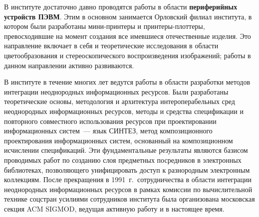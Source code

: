 \begin{multicols}{2}
{}

     В институте достаточно давно проводятся работы в области
\textbf{периферийных устройств ПЭВМ}. Этим в основном
занимается Орловский филиал института, в котором были
разработаны ми\-ни-прин\-те\-ры и прин\-те\-ры-плот\-те\-ры, превосходившие
на момент создания все имевшиеся отечественные изделия. Это
направление включает в себя и теоретические исследования в
области цветообразования и стереоскопического воспроизведения
изображений; работы в данном направлении активно развиваются.

     В институте в течение многих лет ведутся работы в области
разработки методов интеграции неоднородных информационных
ресурсов. Были разработаны теоретические основы, методология и
архитектура интероперабельных сред неоднородных
информационных ресурсов, методы и средства спецификации и
повторного совместного использования ресурсов при
проектировании информационных систем~--- язык СИНТЕЗ, метод
композиционного проектирования информационных %
сис\-тем,
основанный на композиционном исчислении спецификаций. Эти
фундаментальные результаты являются базисом проводимых работ
по %
 созданию слоя предметных посредников в электронных
биб\-лио\-те\-ках, позволяющего унифицировать доступ к разнородным
электронным коллекциям. После прекращения в 1991~г.\
сотрудничества в об\-ласти интеграции неоднородных
информационных ресурсов в рамках комиссии по вычислительной
технике соцстран усилиями сотрудников института была
организована московская секция ACM \mbox{SIGMOD}, ведущая активную
работу и в настоящее время.
{

}


\end{multicols}
